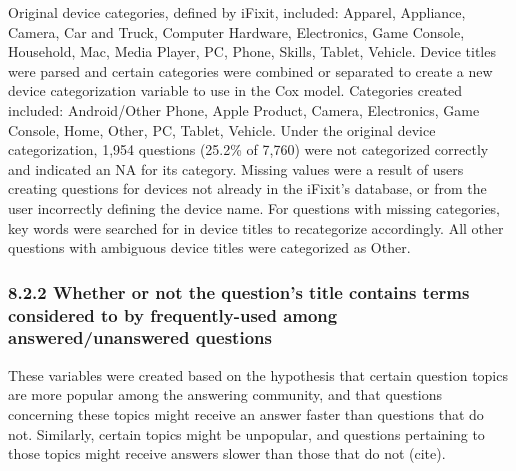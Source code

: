 \documentclass{article}
\begin{document}
Original device categories, defined by iFixit, included: Apparel, Appliance, Camera, Car and Truck, Computer Hardware, Electronics, Game Console, Household, Mac, Media Player, PC, Phone, Skills, Tablet, Vehicle. Device titles were parsed and certain categories were combined or separated to create a new device categorization variable to use in the Cox model. Categories created included: Android/Other Phone, Apple Product, Camera, Electronics, Game Console, Home, Other, PC, Tablet, Vehicle. Under the original device categorization, 1,954 questions (25.2\% of 7,760) were not categorized correctly and indicated an NA for its category. Missing values were a result of users creating questions for devices not already in the iFixit's database, or from the user incorrectly defining the device name. For questions with missing categories, key words were searched for in device titles to recategorize accordingly. All other questions with ambiguous device titles were categorized as Other. 

\subsubsection*{8.2.2 Whether or not the question's title contains terms considered to by frequently-used among answered/unanswered questions}

These variables were created based on the hypothesis that certain question topics are more popular among the answering community, and that questions concerning these topics might receive an answer faster than questions that do not. Similarly, certain topics might be unpopular, and questions pertaining to those topics might receive answers slower than those that do not (cite).
\end{document}
